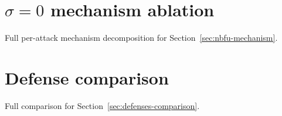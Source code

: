 \documentclass[11pt]{article}
\begin{document}
\section{$\sigma{=}0$ mechanism ablation}
\label{app:mechanism}
Full per-attack mechanism decomposition for Section~\ref{sec:nbfu-mechanism}.

\begin{table}[h]
\centering
\small
\setlength{\tabcolsep}{3pt}
\caption{Clipping-only ($\sigma{=}0$) vs.\ full NBFU ($\varepsilon{=}5$), mean$\pm$std over 3 seeds. Clipping handles attacks with scale-sensitive image priors (IG/GradInversion on medical drop 13--25\% under clipping alone); noise handles scale-invariant cosine matching (UAV IG sees zero effect from clipping but full defense once noise is added).}
\label{tab:cliponly}
\end{table}

\section{Defense comparison}
\label{app:defenses}
Full comparison for Section~\ref{sec:defenses-comparison}.
\end{document}
